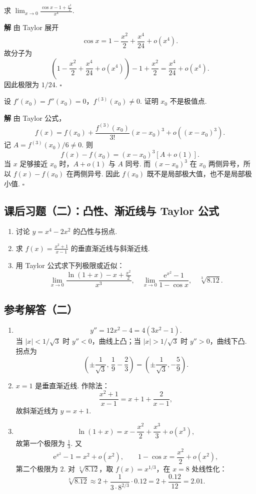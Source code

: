 \documentclass[fontset=fandol]{ctexart}
\newenvironment{solution}{\par\noindent\textbf{解}\quad}{\hfill$\square$\par\vspace{0.8em}}
\newcommand{\ee}{\mathrm{e}}
\begin{document}
\begin{example}[极限]
求 $\displaystyle\lim_{x\to0}\frac{\cos x-1+\frac{x^2}{2}}{x^4}$.
\end{example}
\begin{solution}
由 Taylor 展开
\[
\cos x=1-\frac{x^2}{2}+\frac{x^4}{24}+o(x^4).
\]
故分子为
\[
\left(1-\frac{x^2}{2}+\frac{x^4}{24}+o(x^4)\right)-1+\frac{x^2}{2}
=\frac{x^4}{24}+o(x^4).
\]
因此极限为 $1/24$.
\end{solution}

\begin{example}
设 $f'(x_0)=f''(x_0)=0$，$f^{(3)}(x_0)\neq0$. 证明 $x_0$ 不是极值点.
\end{example}
\begin{solution}
由 Taylor 公式，
\[
f(x)=f(x_0)+\frac{f^{(3)}(x_0)}{3!}(x-x_0)^3+o((x-x_0)^3).
\]
记 $A=f^{(3)}(x_0)/6\neq0$. 则
\[
f(x)-f(x_0)=(x-x_0)^3[A+o(1)].
\]
当 $x$ 足够接近 $x_0$ 时，$A+o(1)$ 与 $A$ 同号. 而 $(x-x_0)^3$ 在 $x_0$ 两侧异号，所以 $f(x)-f(x_0)$ 在两侧异号. 因此 $f(x_0)$ 既不是局部极大值，也不是局部极小值.
\end{solution}

\subsection{课后习题（二）：凸性、渐近线与 Taylor 公式}
\begin{enumerate}[label=\textbf{练习\arabic*.},leftmargin=2.2em]
\item 讨论 $y=x^4-2x^2$ 的凸性与拐点.
\item 求 $f(x)=\frac{x^2+1}{x-1}$ 的垂直渐近线与斜渐近线.
\item 用 Taylor 公式求下列极限或近似：
\[
\lim_{x\to0}\frac{\ln(1+x)-x+\frac{x^2}{2}}{x^3},\quad
\lim_{x\to0}\frac{\ee^{x^2}-1}{1-\cos x},\quad
\sqrt[3]{8.12}.
\]
\end{enumerate}

\subsection{参考解答（二）}
\begin{enumerate}[label=\textbf{练习\arabic*.},leftmargin=2.2em]
\item
\[
y''=12x^2-4=4(3x^2-1).
\]
当 $|x|<1/\sqrt3$ 时 $y''<0$，曲线上凸；当 $|x|>1/\sqrt3$ 时 $y''>0$，曲线下凸. 拐点为
\[
\left(\pm\frac1{\sqrt3},\,\frac19-\frac23\right)=\left(\pm\frac1{\sqrt3},-\frac59\right).
\]
\item $x=1$ 是垂直渐近线. 作除法：
\[
\frac{x^2+1}{x-1}=x+1+\frac2{x-1},
\]
故斜渐近线为 $y=x+1$.
\item
\[
\ln(1+x)=x-\frac{x^2}{2}+\frac{x^3}{3}+o(x^3),
\]
故第一个极限为 $\frac13$. 又
\[
\ee^{x^2}-1=x^2+o(x^2),\qquad 1-\cos x=\frac{x^2}{2}+o(x^2),
\]
第二个极限为 $2$. 对 $\sqrt[3]{8.12}$，取 $f(x)=x^{1/3}$，在 $x=8$ 处线性化：
\[
\sqrt[3]{8.12}\approx2+\frac{1}{3\cdot 8^{2/3}}\cdot0.12=2+\frac{0.12}{12}=2.01.
\]
\end{enumerate}
\end{document}
